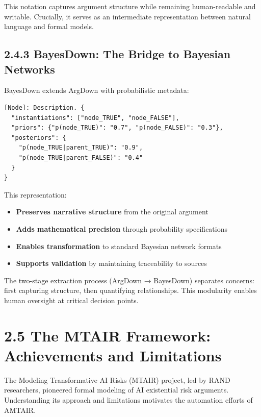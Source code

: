 \documentclass[
  11pt,
  letterpaper,
]{book}
\providecommand{\tightlist}{%
  \setlength{\itemsep}{0pt}\setlength{\parskip}{0pt}}
\begin{document}
This notation captures argument structure while remaining human-readable
and writable. Crucially, it serves as an intermediate representation
between natural language and formal models.

\subsection*{2.4.3 BayesDown: The Bridge to Bayesian
Networks}\label{sec-bayesdown}

BayesDown extends ArgDown with probabilistic metadata:

\begin{verbatim}
[Node]: Description. {
  "instantiations": ["node_TRUE", "node_FALSE"],
  "priors": {"p(node_TRUE)": "0.7", "p(node_FALSE)": "0.3"},
  "posteriors": {
    "p(node_TRUE|parent_TRUE)": "0.9",
    "p(node_TRUE|parent_FALSE)": "0.4"
  }
}
\end{verbatim}

This representation:

\begin{itemize}
\tightlist
\item
  \textbf{Preserves narrative structure} from the original argument
\item
  \textbf{Adds mathematical precision} through probability
  specifications
\item
  \textbf{Enables transformation} to standard Bayesian network formats
\item
  \textbf{Supports validation} by maintaining traceability to sources
\end{itemize}

The two-stage extraction process (ArgDown → BayesDown) separates
concerns: first capturing structure, then quantifying relationships.
This modularity enables human oversight at critical decision points.

\section*{2.5 The MTAIR Framework: Achievements and
Limitations}\label{sec-mtair-framework}


The Modeling Transformative AI Risks (MTAIR) project, led by RAND
researchers, pioneered formal modeling of AI existential risk arguments.
Understanding its approach and limitations motivates the automation
efforts of AMTAIR.
\end{document}
